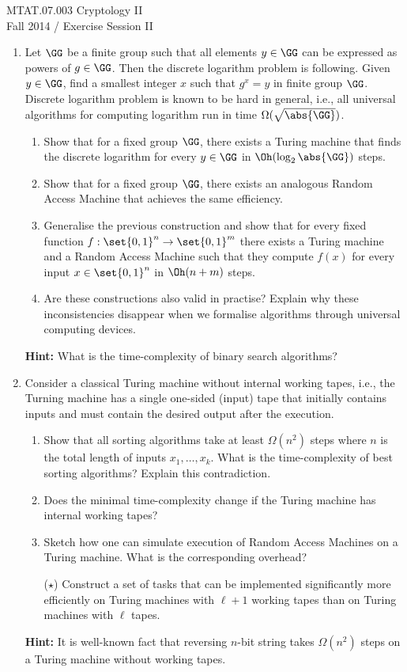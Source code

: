 \documentclass{article}
\begin{document}
\noindent	
MTAT.07.003 Cryptology II\\
Fall 2014 / Exercise Session II 


\begin{enumerate}

\item Let $\GG$ be a finite group such that all elements $y\in\GG$ can
  be expressed as powers of $g\in\GG$. Then the discrete logarithm
  problem is following. Given $y\in\GG$, find a smallest integer $x$
  such that $g^x=y$ in finite group $\GG$. Discrete logarithm problem
  is known to be hard in general, i.e., all universal algorithms for
  computing logarithm run in time $\Omega(\sqrt{\abs{\GG}})$.
  \begin{enumerate}
  \item Show that for a fixed group $\GG$, there exists a Turing
    machine that finds the discrete logarithm for every $y\in\GG$ in
    $\Oh(\log_2\abs{\GG})$ steps.
  \item Show that for a fixed group $\GG$, there exists an analogous
    Random Access Machine that achieves the same efficiency.
  \item Generalise the previous construction and show that for every
    fixed function $f:\set{0,1}^n\to\set{0,1}^m$ there exists a Turing
    machine and a Random Access Machine such that they compute $f(x)$
    for every input $x\in\set{0,1}^n$ in $\Oh(n+m)$ steps.
  \item Are these constructions also valid in practise? Explain why
    these inconsistencies disappear when we formalise algorithms
    through universal computing devices.
  \end{enumerate}
  \textbf{Hint:} What is the time-complexity of binary search
  algorithms?

\item Consider a classical Turing machine without internal working
  tapes, i.e., the Turning machine has a single one-sided (input) tape
  that initially contains inputs and must contain the desired output
  after the execution.
  \begin{enumerate}
  \item Show that all sorting algorithms take at least $\Omega(n^2)$
    steps where $n$ is the total length of inputs $x_1,\ldots, x_k$.
    What is the time-complexity of best sorting algorithms? Explain
    this contradiction.
  \item Does the minimal time-complexity change if the Turing machine
    has internal working tapes?
  \item Sketch how one can simulate execution of Random Access
    Machines on a Turing machine. What is the corresponding overhead?
  \item[($\star$)] Construct a set of tasks that can be implemented
    significantly more efficiently on Turing machines with $\ell+1$
    working tapes than on Turing machines with $\ell$ tapes.
  \end{enumerate}
  \textbf{Hint:} It is well-known fact that reversing $n$-bit string
  takes $\Omega(n^2)$ steps on a Turing machine without working tapes.



\end{enumerate}
\end{document}
